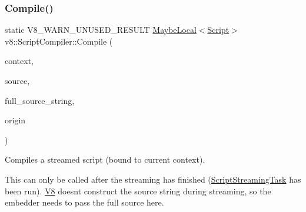 \subsubsection{\texorpdfstring{Compile()}{Compile()}\hspace{0.1cm}{\footnotesize\ttfamily [2/2]}}
{\footnotesize\ttfamily static V8\+\_\+\+W\+A\+R\+N\+\_\+\+U\+N\+U\+S\+E\+D\+\_\+\+R\+E\+S\+U\+LT \mbox{\hyperlink{classv8_1_1MaybeLocal}{Maybe\+Local}}$<$\mbox{\hyperlink{classv8_1_1Script}{Script}}$>$ v8\+::\+Script\+Compiler\+::\+Compile (\begin{DoxyParamCaption}\item[{\mbox{\hyperlink{classv8_1_1Local}{Local}}$<$ \mbox{\hyperlink{classv8_1_1Context}{Context}} $>$}]{context,  }\item[{\mbox{\hyperlink{classv8_1_1ScriptCompiler_1_1StreamedSource}{Streamed\+Source}} $\ast$}]{source,  }\item[{\mbox{\hyperlink{classv8_1_1Local}{Local}}$<$ \mbox{\hyperlink{classv8_1_1String}{String}} $>$}]{full\+\_\+source\+\_\+string,  }\item[{const \mbox{\hyperlink{classv8_1_1ScriptOrigin}{Script\+Origin}} \&}]{origin }\end{DoxyParamCaption})\hspace{0.3cm}{\ttfamily [static]}}

Compiles a streamed script (bound to current context).

This can only be called after the streaming has finished (\mbox{\hyperlink{classv8_1_1ScriptCompiler_1_1ScriptStreamingTask}{Script\+Streaming\+Task}} has been run). \mbox{\hyperlink{classv8_1_1V8}{V8}} doesn\textquotesingle{}t construct the source string during streaming, so the embedder needs to pass the full source here. \mbox{\label{classv8_1_1ScriptCompiler_a7a735ad28cd9925ef67c57a76422116c}} 
